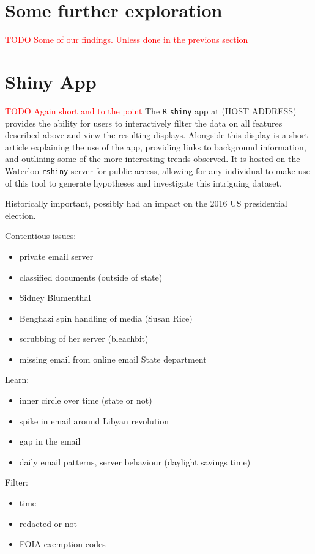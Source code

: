 \documentclass[journal]{vgtc}                %
\newcommand*{\TODO}[1]{\textcolor{red}{TODO #1}}
\begin{document}
\section{Some further exploration}
\TODO{Some of our findings.  Unless done in the previous section}
\section{Shiny App}
\TODO{Again short and to the point}
The \texttt{R} \texttt{shiny} app at (HOST ADDRESS) provides the ability for users to interactively filter the data on all features described above and view the resulting displays. Alongside this display is a short article explaining the use of the app, providing links to background information, and outlining some of the more interesting trends observed. It is hosted on the Waterloo \texttt{rshiny} server for public access, allowing for any individual to make use of this tool to generate hypotheses and investigate this intriguing dataset.


Historically important,  possibly had an impact on the 2016 US presidential election.

Contentious issues:
\begin{itemize}
\item private email server
\item classified documents (outside of state)
\item Sidney Blumenthal
\item Benghazi spin handling of media (Susan Rice)

\item scrubbing of her server (bleachbit)
\item missing email from online email State department
\end{itemize}


Learn:
\begin{itemize}
\item inner circle over time (state or not)
\item spike in email around Libyan revolution
\item gap in the email
\item daily email patterns, server behaviour (daylight savings time)
\end{itemize}

  
 Filter:
\begin{itemize}
\item time
\item redacted or not
\item FOIA exemption codes
\end{itemize}
\end{document}
